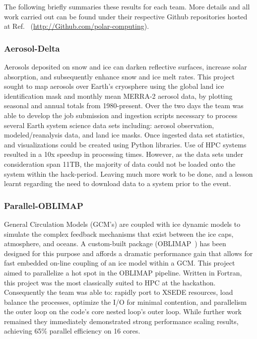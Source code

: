 \documentclass[conference]{IEEEtran}
\begin{document}
The following briefly summaries these results for each team.  More details and all work carried out can be found under their respective Github repositories hosted at Ref.~\cite{polar-computing-Github} (\url{http://Github.com/polar-computing}). 

\subsubsection{Aerosol-Delta}
Aerosols deposited on snow and ice can darken reflective surfaces, increase solar absorption, and subsequently enhance snow and ice melt rates. This project sought to map aerosols over Earth's cryosphere using the global land ice identification mask and monthly mean MERRA-2 aerosol data, by plotting seasonal and annual totals from 1980-present. Over the two days the team was able to develop the job submission and ingestion scripts necessary to process several Earth system science data sets including: aerosol observation, modeled/reanalysis data, and land ice masks.  Once ingested data set statistics, and visualizations could be created using Python libraries.  Use of HPC systems resulted in a 10x speedup in processing times.  However, as the data sets under consideration span 11TB, the majority of data could not be loaded onto the system within the hack-period. Leaving much more work to be done, and a lesson learnt regarding the need to download data to a system prior to the event.
\subsubsection{Parallel-OBLIMAP}
General Circulation Models (GCM's) are coupled with ice dynamic models to simulate the complex feedback mechanisms that exist between the ice caps, atmosphere, and oceans. A custom-built package (OBLIMAP~\cite{Reerink2016-xr}) has been designed for this purpose and affords a dramatic performance gain that allows for fast embedded on-line coupling of an ice model within a GCM. This project aimed to parallelize a hot spot in the OBLIMAP pipeline.  Written in Fortran, this project was the most classically suited to HPC at the hackathon.  Consequently the team was able to: rapidly port to XSEDE resources, load balance the processes, optimize the I/O for minimal contention, and parallelism the outer loop on the code's core nested loop's outer loop.  While further work remained they immediately demonstrated strong performance scaling results, achieving 65\% parallel efficiency on 16 cores.
\end{document}

